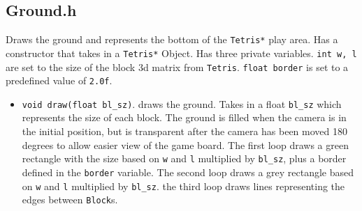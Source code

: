 \documentclass[letterpaper, 12pt]{article}
\begin{document}
\subsection{Ground.h}
Draws the ground and represents the bottom of the \verb|Tetris*| play area.
Has a constructor that takes in a \verb|Tetris*| Object.
Has three private variables.
\verb|int w, l| are set to the size of the block 3d matrix from \verb|Tetris|.
\verb|float border| is set to a predefined value of \verb|2.0f|.
\begin{itemize}
    \item \verb|void draw(float bl_sz)|. draws the ground.
    Takes in a float \verb|bl_sz| which represents the size of each block.
    The ground is filled when the camera is in the initial position, but is transparent after the camera has been moved 180 degrees to allow easier view of the game board.
    The first loop draws a green rectangle with the size based on \verb|w| and \verb|l| multiplied by \verb|bl_sz|, plus a border defined in the \verb|border| variable.
    The second loop draws a grey rectangle based on \verb|w| and \verb|l| multiplied by \verb|bl_sz|.
    the third loop draws lines representing the edges between \verb|Block|s.
\end{itemize}
\end{document}
